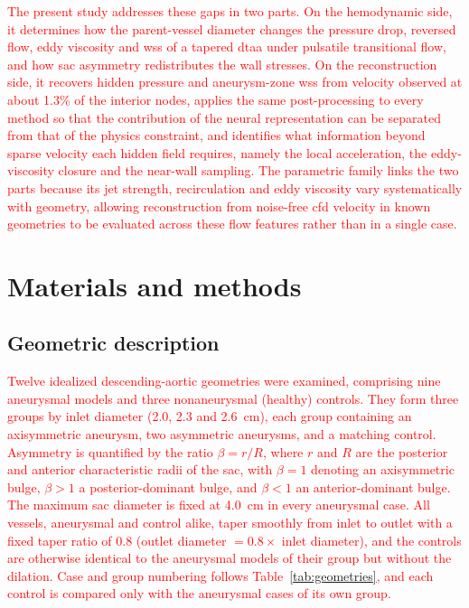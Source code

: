 \documentclass[12pt,a4paper]{article}
\newcommand{\CFD}{\ac{cfd}\xspace}
\newcommand{\DTAA}{\ac{dtaa}\xspace}
\newcommand{\WSS}{\ac{wss}\xspace}
\theoremstyle{definition}
\numberwithin{equation}{section}
\newcommand{\revision}[1]{\textcolor{red}{#1}}
\begin{document}
\revision{The present study addresses these gaps in two parts. On the hemodynamic side, it determines how the parent-vessel diameter changes the pressure drop, reversed flow, eddy viscosity and \WSS of a tapered \DTAA under pulsatile transitional flow, and how sac asymmetry redistributes the wall stresses. On the reconstruction side, it recovers hidden pressure and aneurysm-zone \WSS from velocity observed at about 1.3\% of the interior nodes, applies the same post-processing to every method so that the contribution of the neural representation can be separated from that of the physics constraint, and identifies what information beyond sparse velocity each hidden field requires, namely the local acceleration, the eddy-viscosity closure and the near-wall sampling. The parametric family links the two parts because its jet strength, recirculation and eddy viscosity vary systematically with geometry, allowing reconstruction from noise-free \CFD velocity in known geometries to be evaluated across these flow features rather than in a single case.}

\section{\label{Material and Methods}Materials and methods}
\subsection{\label{Geometric Description}Geometric description}
\revision{Twelve idealized descending-aortic geometries were examined, comprising nine aneurysmal models and three nonaneurysmal (healthy) controls. They form three groups by inlet diameter (2.0, 2.3 and 2.6~cm), each group containing an axisymmetric aneurysm, two asymmetric aneurysms, and a matching control. Asymmetry is quantified by the ratio $\beta = r/R$, where $r$ and $R$ are the posterior and anterior characteristic radii of the sac, with $\beta = 1$ denoting an axisymmetric bulge, $\beta > 1$ a posterior-dominant bulge, and $\beta < 1$ an anterior-dominant bulge. The maximum sac diameter is fixed at 4.0~cm in every aneurysmal case. All vessels, aneurysmal and control alike, taper smoothly from inlet to outlet with a fixed taper ratio of 0.8 (outlet diameter $=0.8\times$ inlet diameter), and the controls are otherwise identical to the aneurysmal models of their group but without the dilation. Case and group numbering follows Table~\ref{tab:geometries}, and each control is compared only with the aneurysmal cases of its own group.}
\end{document}
